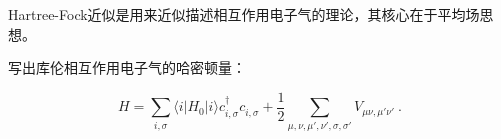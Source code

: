 
Hartree-Fock近似是用来近似描述相互作用电子气的理论，其核心在于平均场思想。

写出库伦相互作用电子气的哈密顿量：

$$H=\sum\limits_{i,\sigma}\langle i|H_0|i\rangle c_{i,\sigma}^\dagger c_{i,\sigma}^~+\frac{1}{2}\sum\limits_{\mu ,\nu,\mu', \nu',\sigma,\sigma'}V_{\mu \nu,\mu' \nu'}~. $$
